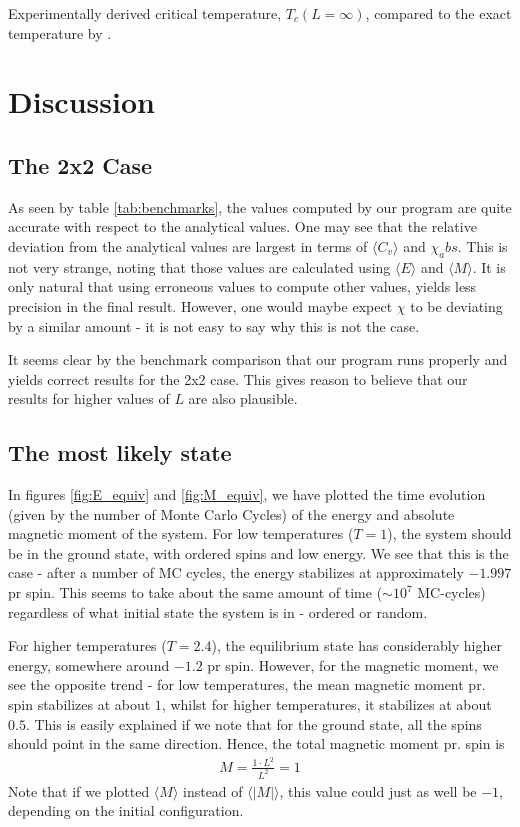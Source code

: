 \documentclass[12pt,english,a4paper]{article}
\begin{document}
\begin{table}[H]
    \centerline{}
    \caption{Experimentally derived critical temperature, $T_c(L=\infty)$, compared to the exact temperature by \cite{LarsOns}.}
    \label{tab:critical}
\end{table}

\section{Discussion} \label{discussion}

\subsection{The 2x2 Case}
As seen by table \ref{tab:benchmarks}, the values computed by our program are quite accurate with respect to the analytical values. One may see that the relative deviation from the analytical values are largest in terms of $\langle C_v \rangle$ and $\chi _abs$. This is not very strange, noting that those values are calculated using $\langle E \rangle$ and $\langle M \rangle$. It is only natural that using erroneous values to compute other values, yields less precision in the final result.   However, one would maybe expect $\chi$ to be deviating by a similar amount - it is not easy to say why this is not the case. 

It seems clear by the benchmark comparison that our program runs properly and yields correct results for the 2x2 case. This gives reason to believe that our results for higher values of $L$ are also plausible. 

\subsection{The most likely state}
In figures \ref{fig:E_equiv} and \ref{fig:M_equiv}, we have plotted the time evolution (given by the number of Monte Carlo Cycles) of the energy and absolute magnetic moment of the system. For low temperatures ($T = 1$), the system should be in the ground state, with ordered spins and low energy. We see that this is the case - after a number of MC cycles, the energy stabilizes at approximately $-1.997$ pr spin. This seems to take about the same amount of time ($\sim 10^7$ MC-cycles) regardless of what initial state the system is in - ordered or random. 

For higher temperatures ($T=2.4$), the equilibrium state has considerably higher energy, somewhere around $-1.2$ pr spin. However, for the magnetic moment, we see the opposite trend - for low temperatures, the mean magnetic moment pr. spin stabilizes at about $1$, whilst for higher temperatures, it stabilizes at about $0.5$. This is easily explained if we note that for the ground state, all the spins should point in the same direction. Hence, the total magnetic moment pr. spin is 
\begin{align*}
    M = \frac{1 \cdot L^2}{L^2} = 1
\end{align*}
Note that if we plotted $\langle M \rangle$ instead of $\langle |M| \rangle$, this value could just as well be $-1$, depending on the initial configuration.
\end{document}
